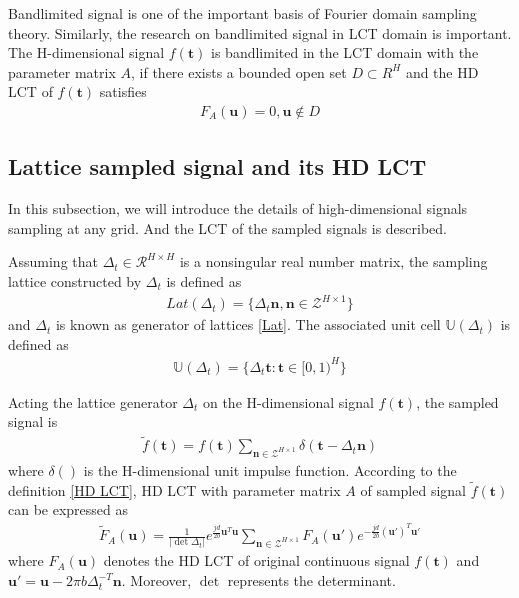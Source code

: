 \documentclass[journal]{IEEEtran}
\begin{document}
Bandlimited signal is one of the important basis of Fourier domain sampling theory. Similarly, the research on bandlimited signal in LCT domain is important. The H-dimensional signal $f(\boldsymbol t)$ is bandlimited in the LCT domain with the parameter matrix $A$, if there exists a bounded open set $ D \subset {R^H} $ and the HD LCT of $f(\boldsymbol t)$ satisfies
\begin{align}
	{F_A}(\boldsymbol u) = 0, \boldsymbol u \notin D
\end{align}

\subsection{Lattice sampled signal and its HD LCT}
In this subsection, we will introduce the details of high-dimensional signals sampling at any grid. And the LCT of the sampled signals is described. 

Assuming that ${\Delta _t} \in {\mathcal{R} ^{H \times H}} $ is a nonsingular real number matrix, the sampling lattice constructed by ${\Delta _t}$ is defined as
\begin{align}
	Lat({\Delta _t}) = \{ {\Delta _t}\boldsymbol n, \boldsymbol n \in {\mathcal Z^{H \times 1}}\}  
	\label{Lat} 
\end{align}
and ${\Delta _t}$ is known as generator of lattices \eqref{Lat}. The associated unit cell $\mathbb{U}(\Delta _t)$ is defined as 
\begin{align}
	\mathbb U({\Delta _t}) = \{ {\Delta _t}\boldsymbol t: \boldsymbol t \in {[0,1)^H}\} 
\end{align}

Acting the lattice generator ${\Delta _t}$ on the H-dimensional signal $f (\boldsymbol t )$, the sampled signal is
\begin{align}
	\widetilde f(\boldsymbol t) = f(\boldsymbol t)\sum\limits_{\boldsymbol n \in {\mathcal Z^{H \times 1}}} {\delta (\boldsymbol t - {\Delta _t}\boldsymbol n)} 
\end{align}
where $ \delta() $ is the H-dimensional unit impulse function.
According to the definition \eqref{HD LCT}, HD LCT with parameter matrix $A$ of sampled signal $ \widetilde f(\boldsymbol t) $ can be expressed as 
\begin{align}
	{{\tilde F}_A}(\boldsymbol u) = \frac{1}{{\left| {\det {\Delta _t}} \right|}}{e^{\frac{{jd}}{{2b}}{\boldsymbol u^T}\boldsymbol u}}\sum\limits_{\boldsymbol n \in {\mathcal Z^{H \times 1}}} {{F_A}(\boldsymbol u'){e^{ - \frac{{jd}}{{2b}}{{(\boldsymbol u')}^T}\boldsymbol u'}}} 
	\label{LCT of Uniform}
\end{align}
where $F_A(\boldsymbol u)$ denotes the HD LCT of original continuous signal $ f(\boldsymbol t) $ and $ \boldsymbol u' =\boldsymbol u - 2\pi b\Delta _t^{ - T} \boldsymbol n $. Moreover, ${\det }$ represents the determinant. 
\end{document}
